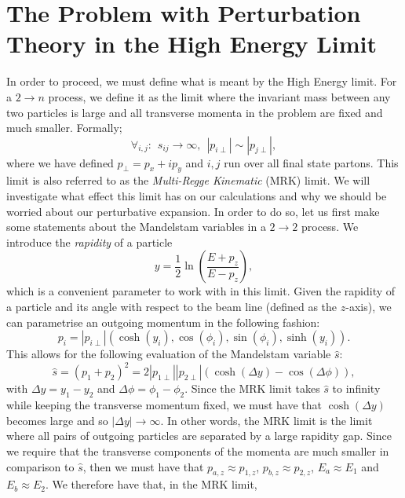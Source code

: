 \section{The Problem with Perturbation Theory in the High Energy Limit}
In order to proceed, we must define what is meant by the High Energy limit. For a $2 \to n$ process, we define it as the limit where the invariant mass between any two particles is large and all transverse momenta in the problem are fixed and much smaller. Formally;
\begin{equation}
\forall_{i,j}:  \hspace{5pt} s_{ij} \to \infty, \hspace{5pt} |p_{i \perp}| \sim |p_{j \perp}|,
\end{equation}
where we have defined $p_{\perp} = p_x + i p_y$ and $i,j$ run over all final state partons. This limit is also referred to as the \emph{Multi-Regge Kinematic} (MRK) limit. We will investigate what effect this limit has on our calculations and why we should be worried about our perturbative expansion. In order to do so, let us first make some statements about the Mandelstam variables in a $2 \to 2$ process. We introduce the \emph{rapidity} of a particle
\begin{equation}
y = \frac{1}{2} \ln \left( \frac{E + p_z}{E - p_z} \right),
\end{equation}
which is a convenient parameter to work with in this limit. Given the rapidity of a particle and its angle with respect to the beam line (defined as the $z$-axis), we can parametrise an outgoing momentum in the following fashion:
\begin{equation}
p_i = |p_{i \perp}| (\cosh(y_i), \cos(\phi_i), \sin(\phi_i), \sinh(y_i)).
\end{equation}
This allows for the following evaluation of the Mandelstam variable $\hat{s}$:
\begin{equation}
\hat{s} = (p_1 + p_2)^2 = 2 |p_{1 \perp}| |p_{2 \perp}| \left(\cosh(\Delta y) - \cos(\Delta \phi)\right),
\end{equation}
with $\Delta y = y_1 - y_2$ and $\Delta \phi = \phi_1 - \phi_2$. Since the MRK limit takes $\hat{s}$ to infinity while keeping the transverse momentum fixed, we must have that $\cosh(\Delta y)$ becomes large and so $|\Delta y| \to \infty$. In other words, the MRK limit is the limit where all pairs of outgoing particles are separated by a large rapidity gap. Since we require that the transverse components of the momenta are much smaller in comparison to $\hat{s}$, then we must have that $p_{a,z} \approx p_{1,z}$, $p_{b,z} \approx p_{2,z}$, $E_a \approx E_1$ and $E_b \approx E_2$. We therefore have that, in the MRK limit,

